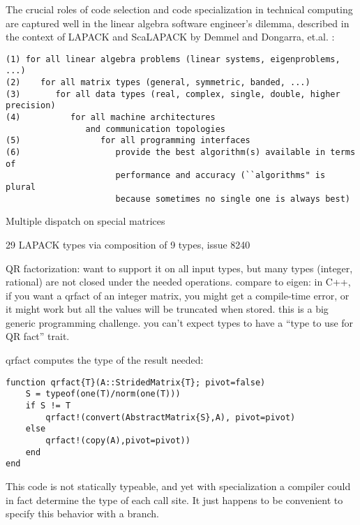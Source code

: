 The crucial roles of code selection and code specialization in technical
computing are captured well in the linear algebra software engineer's dilemma,
described in the context of LAPACK and ScaLAPACK by Demmel and Dongarra,
et.al. \cite{lawn181}:
\vspace{-3ex}
\begin{singlespace}
\begin{small}
\begin{verbatim}
(1) for all linear algebra problems (linear systems, eigenproblems, ...)
(2)    for all matrix types (general, symmetric, banded, ...)
(3)       for all data types (real, complex, single, double, higher precision)
(4)          for all machine architectures
                and communication topologies
(5)                for all programming interfaces
(6)                   provide the best algorithm(s) available in terms of
                      performance and accuracy (``algorithms" is plural
                      because sometimes no single one is always best)
\end{verbatim}
\end{small}
\end{singlespace}

Multiple dispatch on special matrices

29 LAPACK types via composition of 9 types, issue 8240

QR factorization: want to support it on all input types, but many
types (integer, rational) are not closed under the needed operations.
compare to eigen: in C++, if you want a qrfact of an integer matrix,
you might get a compile-time error, or it might work but all the values
will be truncated when stored. this is a big generic programming
challenge. you can't expect types to have a ``type to use for QR fact''
trait.

qrfact computes the type of the result needed:

\begin{singlespace}
\begin{lstlisting}[style=customjulia]
function qrfact{T}(A::StridedMatrix{T}; pivot=false)
    S = typeof(one(T)/norm(one(T)))
    if S != T
        qrfact!(convert(AbstractMatrix{S},A), pivot=pivot)
    else
        qrfact!(copy(A),pivot=pivot))
    end
end
\end{lstlisting}
\end{singlespace}

This code is not statically typeable, and yet with specialization a
compiler could in fact determine the type of each call site.
It just happens to be convenient to specify this behavior with a
branch.


